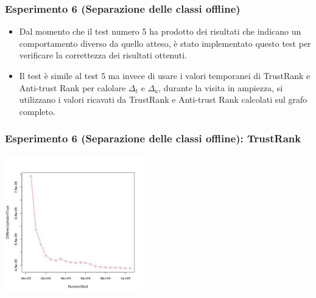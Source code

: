 \documentclass{beamer}
\begin{document}
\begin{frame}
\frametitle{Esperimento 6 {\tiny(Separazione delle classi offline)}}
\begin{itemize}
 \item Dal momento che il test numero 5 ha prodotto dei risultati che indicano un comportamento diverso da quello atteso, è stato implementato questo test per verificare la correttezza dei risultati ottenuti.
 \item Il test è simile al test 5 ma invece di usare i valori temporanei di TrustRank e Anti-trust Rank per calolare \(\Delta_t\) e \(\Delta_a\), durante la visita in ampiezza, si utilizzano i valori ricavati da TrustRank e Anti-trust Rank calcolati sul grafo completo.
 \end{itemize}
\end{frame}
\begin{frame}
\frametitle{Esperimento 6 {\tiny(Separazione delle classi offline)}: TrustRank}
\begin{center}
 \includegraphics[height=6cm]{immagini/test6/averageCompleteTest_trust_62}
\end{center}
\end{frame}
\end{document}
